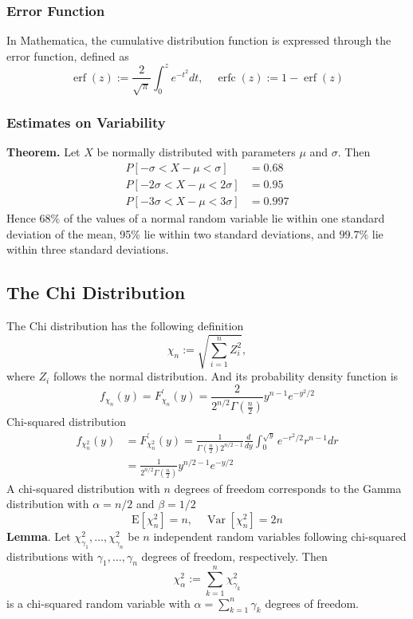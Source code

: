\documentclass[a4paper,12pt]{article}
\begin{document}
\subsubsection{Error Function}
In Mathematica, the cumulative distribution function is expressed through the error function, defined as
$$
\operatorname{erf}(z):=\frac{2}{\sqrt{\pi}} \int_0^z e^{-t^2} d t, \quad \operatorname{erfc}(z):=1-\operatorname{erf}(z)
$$
\subsubsection{Estimates on Variability}
\textbf{Theorem.} Let $X$ be normally distributed with parameters $\mu$ and $\sigma$. Then
$$
\begin{aligned}
P[-\sigma<X-\mu<\sigma] & =0.68 \\
P[-2 \sigma<X-\mu<2 \sigma] & =0.95 \\
P[-3 \sigma<X-\mu<3 \sigma] & =0.997
\end{aligned}
$$
Hence $68 \%$ of the values of a normal random variable lie within one standard deviation of the mean, 95\% lie within two standard deviations, and $99.7 \%$ lie within three standard deviations. 

\subsection{The Chi Distribution}
The Chi distribution has the following definition
$$
\chi_n:=\sqrt{\sum_{i=1}^n Z_i^2},
$$
where $Z_i$ follows the normal distribution. And its probability density function is 
\begin{equation}
    f_{\chi_n}(y)=F_{\chi_n}^{\prime}(y)=\frac{2}{2^{n / 2} \Gamma\left(\frac{n}{2}\right)} y^{n-1} e^{-y^2 / 2}
    \end{equation}
Chi-squared distribution
\begin{equation}
    \begin{aligned}
    f_{\chi_n^2}(y) & =F_{\chi_n^2}^{\prime}(y)=\frac{1}{\Gamma\left(\frac{n}{2}\right) 2^{n / 2-1}} \frac{d}{d y} \int_0^{\sqrt{y}} e^{-r^2 / 2} r^{n-1} d r \\
    & =\frac{1}{2^{n / 2} \Gamma\left(\frac{n}{2}\right)} y^{n / 2-1} e^{-y / 2}
    \end{aligned}
    \end{equation}
    A chi-squared distribution with $n$ degrees of freedom corresponds to the Gamma distribution with $\alpha=n / 2$ and $\beta=1 / 2$\\
    $$\mathrm{E}\left[\chi_n^2\right]=n, \quad \operatorname{Var}\left[\chi_n^2\right]=2 n$$
\textbf{Lemma}. Let $\chi_{\gamma_1}^2, \ldots, \chi_{\gamma_n}^2$ be $n$ independent random variables following chi-squared distributions with $\gamma_1, \ldots, \gamma_n$ degrees of freedom, respectively. Then
    \begin{equation}
        \chi_\alpha^2:=\sum_{k=1}^n \chi_{\gamma_k}^2
    \end{equation}
    is a chi-squared random variable with $\alpha=\sum_{k=1}^n \gamma_k$ degrees of freedom.
\end{document}
